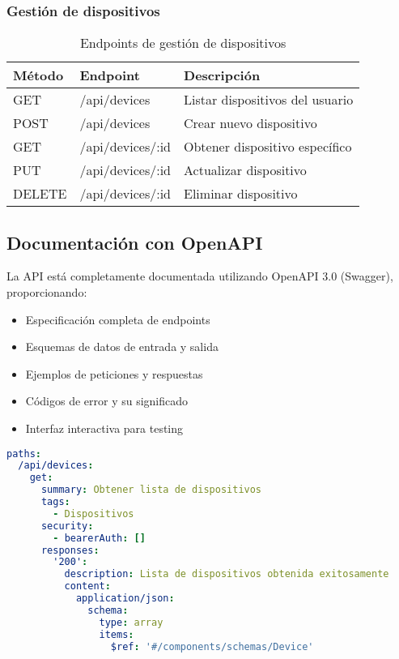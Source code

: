 \subsubsection{Gestión de dispositivos}

\begin{table}[H]
\centering
\begin{tabular}{|l|l|l|}
\hline
\textbf{Método} & \textbf{Endpoint} & \textbf{Descripción} \\
\hline
GET & /api/devices & Listar dispositivos del usuario \\
POST & /api/devices & Crear nuevo dispositivo \\
GET & /api/devices/:id & Obtener dispositivo específico \\
PUT & /api/devices/:id & Actualizar dispositivo \\
DELETE & /api/devices/:id & Eliminar dispositivo \\
\hline
\end{tabular}
\caption{Endpoints de gestión de dispositivos}
\label{tab:endpoints_devices}
\end{table}

\subsection{Documentación con OpenAPI}

La API está completamente documentada utilizando OpenAPI 3.0 (Swagger), proporcionando:

\begin{itemize}
    \item Especificación completa de endpoints
    \item Esquemas de datos de entrada y salida
    \item Ejemplos de peticiones y respuestas
    \item Códigos de error y su significado
    \item Interfaz interactiva para testing
\end{itemize}

\begin{lstlisting}[language=YAML, caption=Ejemplo de documentación OpenAPI]
paths:
  /api/devices:
    get:
      summary: Obtener lista de dispositivos
      tags:
        - Dispositivos
      security:
        - bearerAuth: []
      responses:
        '200':
          description: Lista de dispositivos obtenida exitosamente
          content:
            application/json:
              schema:
                type: array
                items:
                  $ref: '#/components/schemas/Device'
\end{lstlisting}

